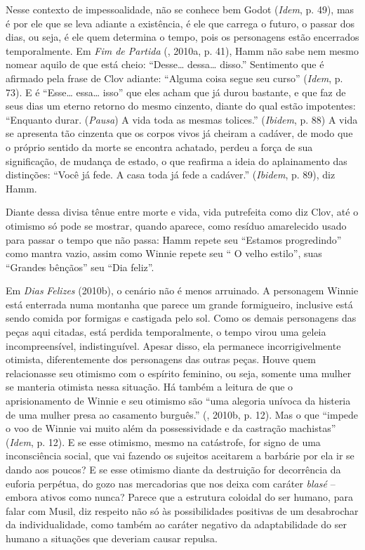 Nesse contexto de impessoalidade, não se conhece bem Godot (\emph{Idem},
p. 49), mas é por ele que se leva adiante a existência, é ele que
carrega o futuro, o passar dos dias, ou seja, é ele quem determina o
tempo, pois os personagens estão encerrados temporalmente. Em \emph{Fim
de Partida} (, 2010a, p. 41), Hamm não sabe nem mesmo nomear
aquilo de que está cheio: ``Desse\ldots{} dessa\ldots{} disso.'' Sentimento que é
afirmado pela frase de Clov adiante: ``Alguma coisa segue seu curso''
(\emph{Idem}, p. 73). E é ``Esse\ldots{} essa\ldots{} isso'' que eles acham que já
durou bastante, e que faz de seus dias um eterno retorno do mesmo
cinzento, diante do qual estão impotentes: ``Enquanto durar.
(\emph{Pausa}) A vida toda as mesmas tolices.'' (\emph{Ibidem}, p. 88) A
vida se apresenta tão cinzenta que os corpos vivos já cheiram a cadáver,
de modo que o próprio sentido da morte se encontra achatado, perdeu a
força de sua significação, de mudança de estado, o que reafirma a ideia
do aplainamento das distinções: ``Você já fede. A casa toda já fede a
cadáver.'' (\emph{Ibidem}, p. 89), diz Hamm.

Diante dessa divisa tênue entre morte e vida, vida putrefeita como diz
Clov, até o otimismo só pode se mostrar, quando aparece, como resíduo
amarelecido usado para passar o tempo que não passa: Hamm repete seu
``Estamos progredindo'' como mantra vazio, assim como Winnie repete seu
`` O velho estilo'', suas ``Grandes bênçãos'' seu ``Dia feliz''.

Em \emph{Dias} \emph{Felizes} (2010b), o cenário não é menos arruinado.
A personagem Winnie está enterrada numa montanha que parece um grande
formigueiro, inclusive está sendo comida por formigas e castigada pelo
sol. Como os demais personagens das peças aqui citadas, está perdida
temporalmente, o tempo virou uma geleia incompreensível, indistinguível.
Apesar disso, ela permanece incorrigivelmente otimista, diferentemente
dos personagens das outras peças. Houve quem relacionasse seu otimismo com o
espírito feminino, ou seja, somente uma mulher se manteria otimista
nessa situação. Há também a leitura de que o aprisionamento de Winnie e
seu otimismo são ``uma alegoria unívoca da histeria de uma mulher presa
ao casamento burguês.'' (, 2010b, p. 12). Mas o que ``impede o
voo de Winnie vai muito além da possessividade e da castração
machistas'' (\emph{Idem}, p. 12). E se esse otimismo, mesmo na
catástrofe, for signo de uma inconsciência social, que vai fazendo os
sujeitos aceitarem a barbárie por ela ir se dando aos poucos? E se esse
otimismo diante da destruição for decorrência da euforia perpétua, do
gozo nas mercadorias que nos deixa com caráter \emph{blasé} -- embora
ativos como nunca? Parece que a estrutura coloidal do ser humano, para
falar com Musil, diz respeito não só às possibilidades positivas de um
desabrochar da individualidade, como também ao caráter negativo da
adaptabilidade do ser humano a situações que deveriam causar repulsa.

